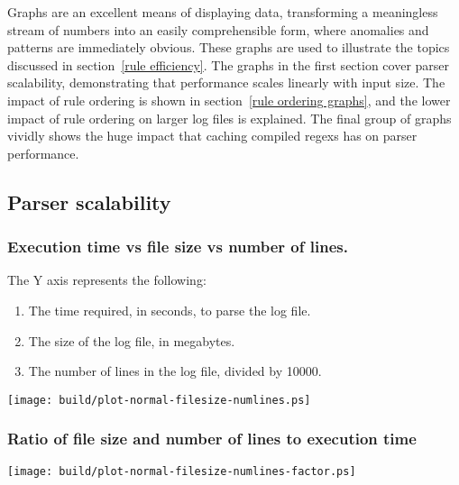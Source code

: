 \documentclass[a4paper,12pt,draft]{article}
\begin{document}
Graphs are an excellent means of displaying data, transforming a
meaningless stream of numbers into an easily comprehensible form, where
anomalies and patterns are immediately obvious.  These graphs are used to
illustrate the topics discussed in section~\ref{rule efficiency}.  The
graphs in the first section cover parser scalability, demonstrating that
performance scales linearly with input size.  The impact of rule ordering
is shown in section~\ref{rule ordering graphs}, and the lower impact of
rule ordering on larger log files is explained.  The final group of graphs
vividly shows the huge impact that caching compiled regexs has on parser
performance.

\subsection{Parser scalability}

\subsubsection{Execution time vs file size vs number of lines.}
\label{execution time vs file size vs number lines}

The Y axis represents the following:

\begin{enumerate}

    \item The time required, in seconds, to parse the log file.

    \item The size of the log file, in megabytes.

    \item The number of lines in the log file, divided by 10000.

\end{enumerate}

\noindent
\texttt{[image: build/plot-normal-filesize-numlines.ps]}

\subsubsection{Ratio of file size and number of lines to execution time}
\label{execution time vs file size vs number lines factor}

\noindent
\texttt{[image: build/plot-normal-filesize-numlines-factor.ps]}


\end{document}
